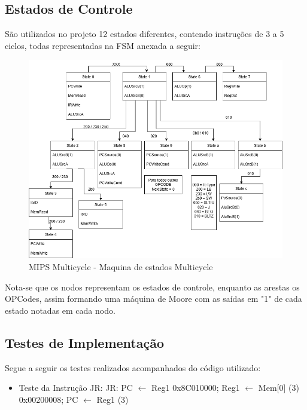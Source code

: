 \documentclass{report}
\begin{document}
        
        \subsection{Estados de Controle}
        São utilizados no projeto 12 estados diferentes, contendo instruções de 3 a 5 ciclos, todas representadas na FSM anexada a seguir:
        \begin{figure}[h!]
            \centering
            \includegraphics[width=\linewidth]{images/prints/Multicycle/FSM Multicycle.png}
            \caption{\label{print:FSM_Multicycle} MIPS Multicycle - Maquina de estados Multicycle}
        \end{figure}
        Nota-se que os nodos representam os estados de controle, enquanto as arestas os OPCodes, assim formando uma máquina de Moore com as saídas em "1" de cada estado notadas em cada nodo.

        \subsection{Testes de Implementação}
        Segue a seguir os testes realizados acompanhados do código utilizado:

        \begin{itemize}
            \item Teste da Instrução JR:
                \subitem JR: PC $\leftarrow$ Reg1
                \subitem 0x8C010000; Reg1 $\leftarrow$ Mem[0] (3)
                \subitem 0x00200008; PC $\leftarrow$ Reg1 (3)
        \end{itemize}
\end{document}
